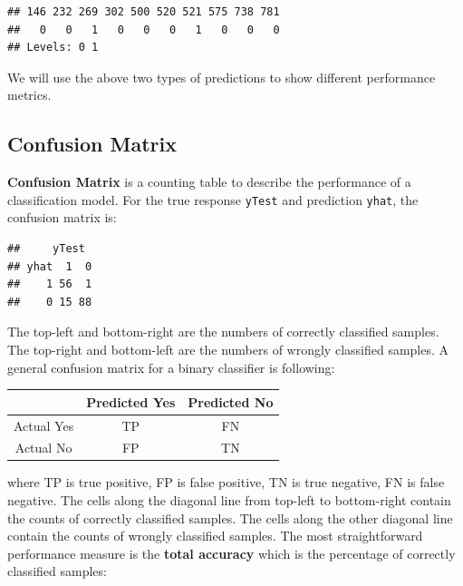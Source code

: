 \documentclass[12pt,]{krantz}
\makeatletter
\newenvironment{Shaded}{\begin{snugshade}}{\end{snugshade}}
\newcommand{\KeywordTok}[1]{\textcolor[rgb]{0.27,0.27,0.27}{\textbf{#1}}}
\newcommand{\NormalTok}[1]{#1}
\newcommand{\OperatorTok}[1]{\textcolor[rgb]{0.43,0.43,0.43}{\textbf{#1}}}
\newcommand{\StringTok}[1]{\textcolor[rgb]{0.5,0.5,0.5}{#1}}
\newenvironment{kframe}{%
\medskip{}
\setlength{\fboxsep}{.8em}
 \def\at@end@of@kframe{}%
 \ifinner\ifhmode%
  \def\at@end@of@kframe{\end{minipage}}%
  \begin{minipage}{\columnwidth}%
 \fi\fi%
 \def\FrameCommand##1{\hskip\@totalleftmargin \hskip-\fboxsep
 \colorbox{shadecolor}{##1}\hskip-\fboxsep
     \hskip-\linewidth \hskip-\@totalleftmargin \hskip\columnwidth}%
 \MakeFramed {\advance\hsize-\width
   \@totalleftmargin\z@ \linewidth\hsize
   \@setminipage}}%
 {\par\unskip\endMakeFramed%
 \at@end@of@kframe}
\renewenvironment{Shaded}{\begin{kframe}}{\end{kframe}}
\makeatother
\begin{document}
\begin{verbatim}
## 146 232 269 302 500 520 521 575 738 781 
##   0   0   1   0   0   0   1   0   0   0 
## Levels: 0 1
\end{verbatim}

We will use the above two types of predictions to show different performance metrics.

\hypertarget{confusion-matrix}{%
\subsection{Confusion Matrix}\label{confusion-matrix}}

\textbf{Confusion Matrix} is a counting table to describe the performance of a classification model. For the true response \texttt{yTest} and prediction \texttt{yhat}, the confusion matrix is:

\begin{Shaded}
\end{Shaded}

\begin{verbatim}
##     yTest
## yhat  1  0
##    1 56  1
##    0 15 88
\end{verbatim}

The top-left and bottom-right are the numbers of correctly classified samples. The top-right and bottom-left are the numbers of wrongly classified samples. A general confusion matrix for a binary classifier is following:

\begin{longtable}[]{@{}ccc@{}}
\toprule
& Predicted Yes & Predicted No\tabularnewline
\midrule
\endhead
Actual Yes & TP & FN\tabularnewline
Actual No & FP & TN\tabularnewline
\bottomrule
\end{longtable}

where TP is true positive, FP is false positive, TN is true negative, FN is false negative. The cells along the diagonal line from top-left to bottom-right contain the counts of correctly classified samples. The cells along the other diagonal line contain the counts of wrongly classified samples. The most straightforward performance measure is the \textbf{total accuracy} which is the percentage of correctly classified samples:
\end{document}
